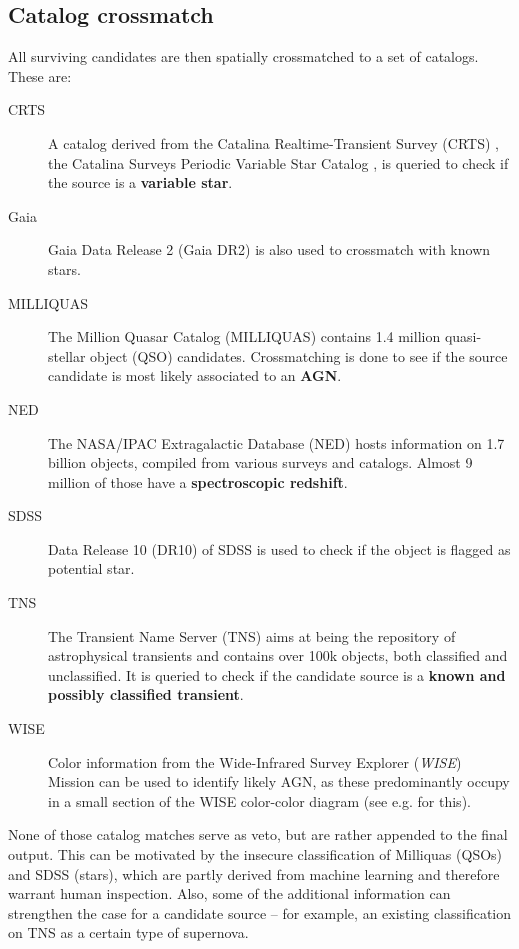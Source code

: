 \subsection{Catalog crossmatch} \label{catmatch}
All surviving candidates are then spatially crossmatched to a set of catalogs. These are:
\begin{description}
    \item[CRTS] A catalog derived from the Catalina Realtime-Transient Survey (CRTS) , the Catalina Surveys Periodic Variable Star Catalog , is queried to check if the source is a \textbf{variable star}.
    \item[Gaia] Gaia Data Release 2 (Gaia DR2)  is also used to crossmatch with known stars.
    \item[MILLIQUAS] The Million Quasar Catalog (MILLIQUAS)  contains 1.4 million quasi-stellar object (QSO) candidates. Crossmatching is done to see if the source candidate is most likely associated to an \textbf{AGN}.
    \item[NED] The NASA/IPAC Extragalactic Database (NED) hosts information on 1.7 billion objects, compiled from various surveys and catalogs. Almost 9 million of those have a \textbf{spectroscopic redshift}.
    \item[SDSS] Data Release 10 (DR10)  of SDSS is used to check if the object is flagged as potential star.
    \item[TNS] The Transient Name Server (TNS) aims at being the repository of astrophysical transients and contains over 100k objects, both classified and unclassified. It is queried to check if the candidate source is a \textbf{known and possibly classified transient}.
    \item[WISE] Color information from the Wide-Infrared Survey Explorer (\textit{WISE}) Mission  can be used to identify likely AGN, as these predominantly occupy in a small section of the WISE color-color diagram (see e.g.  for this).
\end{description}
None of those catalog matches serve as veto, but are rather appended to the final output. This can be motivated by the insecure classification of Milliquas (QSOs) and SDSS (stars), which are partly derived from machine learning and therefore warrant human inspection. Also, some of the additional information can strengthen the case for a candidate source -- for example, an existing classification on TNS as a certain type of supernova. 


